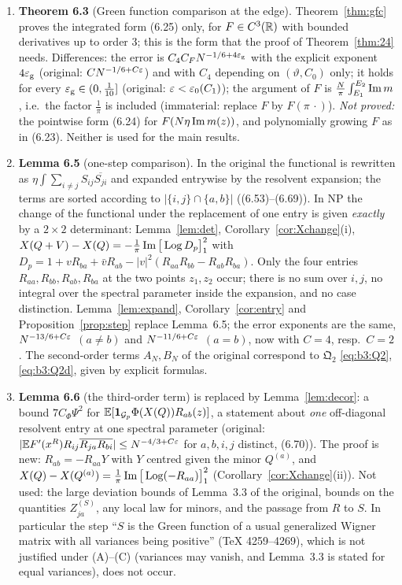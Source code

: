 \begin{enumerate}
\item[\textbf{II.3.}] \textbf{Theorem 6.3} (Green function comparison at the edge). Theorem~\ref{thm:gfc} proves the integrated form (6.25) only, for $F\in C^3(\mathbb{R})$ with bounded derivatives up to order $3$; this is the
form that the proof of Theorem~\ref{thm:24} needs. Differences: the error is $C_4C_FN^{-1/6+4\varepsilon_{\mathrm g}}$ with the explicit exponent $4\varepsilon_{\mathrm g}$ (original: $CN^{-1/6+C\varepsilon}$) and with $C_4$ depending on $(\vartheta,C_0)$ only; it holds for every
$\varepsilon_{\mathrm g}\in(0,\frac1{10}]$ (original: $\varepsilon<\varepsilon_0(C_1)$); the argument of $F$ is $\frac N\pi\int_{E_1}^{E_2}\operatorname{Im} m$, i.e.\ the factor $\frac1\pi$ is included (immaterial: replace $F$ by $F(\pi\,\cdot)$).
\emph{Not proved:} the pointwise form (6.24) for $F(N\eta\operatorname{Im} m(z))$, and polynomially growing $F$ as in (6.23). Neither is used for the main results.

\item[\textbf{II.4.}] \textbf{Lemma 6.5} (one-step comparison). In the original the functional is rewritten as $\eta\int\sum_{i\ne j}S_{ij}\overline{S_{ji}}$ and expanded entrywise by the resolvent expansion; the terms are sorted
according to $|\{i,j\}\cap\{a,b\}|$ ((6.53)--(6.69)). In NP the change of the functional under the replacement of one entry is given \emph{exactly} by a $2\times2$ determinant: Lemma~\ref{lem:det}, Corollary~\ref{cor:Xchange}(i),
$X(Q+V)-X(Q)=-\frac1\pi\operatorname{Im}\big[\operatorname{Log} D_p\big]_{1}^{2}$ with $D_p=1+vR_{ba}+\bar vR_{ab}-|v|^2(R_{aa}R_{bb}-R_{ab}R_{ba})$. Only the four entries $R_{aa},R_{bb},R_{ab},R_{ba}$ at the two points $z_1,z_2$ occur; there is no sum over $i,j$,
no integral over the spectral parameter inside the expansion, and no case distinction. Lemma~\ref{lem:expand}, Corollary~\ref{cor:entry} and Proposition~\ref{prop:step} replace Lemma~6.5; the error exponents are the same,
$N^{-13/6+C\varepsilon}$ $(a\ne b)$ and $N^{-11/6+C\varepsilon}$ $(a=b)$, now with $C=4$, resp.\ $C=2$. The second-order terms $A_N,B_N$ of the original correspond to $\mathfrak Q_2$ \eqref{eq:b3:Q2}, \eqref{eq:b3:Q2d}, given by explicit formulas.

\item[\textbf{II.5.}] \textbf{Lemma 6.6} (the third-order term) is replaced by Lemma~\ref{lem:decor}: a bound $7C_\Phi\Psi^2$ for $\mathbb{E}[\mathbf 1_{\mathcal{G}_p}\Phi(X(Q))R_{ab}(z)]$, a statement about \emph{one} off-diagonal resolvent entry at one
spectral parameter (original: $|\mathbb{E} F'(x^R)R_{ij}\overline{R_{ja}R_{bi}}|\le N^{-4/3+C\varepsilon}$ for $a,b,i,j$ distinct, (6.70)). The proof is new: $R_{ab}=-R_{aa}Y$ with $Y$ centred given the minor $Q^{(a)}$, and
$X(Q)-X(Q^{(a)})=\frac1\pi\operatorname{Im}\big[\operatorname{Log}(-R_{aa})\big]_{1}^{2}$ (Corollary~\ref{cor:Xchange}(ii)). Not used: the large deviation bounds of Lemma~3.3 of the original, bounds on the quantities $Z^{(S)}_{ja}$, any local law for minors, and the
passage from $R$ to $S$. In particular the step ``$S$ is the Green function of a usual generalized Wigner matrix with all variances being positive'' (TeX 4259--4269), which is not justified under (A)--(C) (variances may
vanish, and Lemma~3.3 is stated for equal variances), does not occur.


\end{enumerate}
